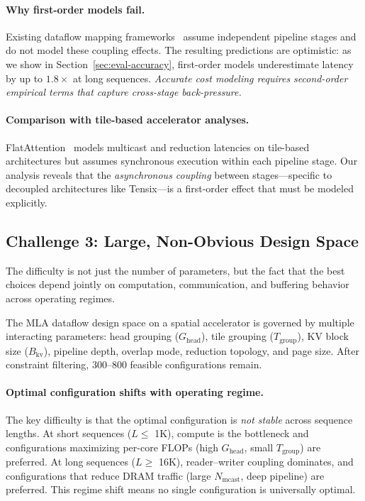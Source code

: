 \documentclass[sigconf, review, anonymous]{acmart}
\newcommand{\Bkv}{B_{\mathrm{kv}}}
\newcommand{\Ghead}{G_{\mathrm{head}}}
\newcommand{\Tgroup}{T_{\mathrm{group}}}
\begin{document}
\paragraph{Why first-order models fail.}
Existing dataflow mapping frameworks~\cite{parashar2019timeloop,
kwon2019maestro} assume independent pipeline stages
and do not model these coupling effects.  The resulting predictions
are optimistic: as we show in Section~\ref{sec:eval-accuracy},
first-order models underestimate latency by up to $1.8\times$ at
long sequences.  \emph{Accurate cost modeling requires second-order
empirical terms that capture cross-stage back-pressure.}

\paragraph{Comparison with tile-based accelerator analyses.}
FlatAttention~\cite{flatattention2024} models multicast and
reduction latencies on tile-based architectures but assumes
synchronous execution within each pipeline stage.  Our analysis
reveals that the \emph{asynchronous coupling} between stages---specific
to decoupled architectures like Tensix---is a first-order effect that
must be modeled explicitly.



\subsection{Challenge 3: Large, Non-Obvious Design Space}\label{sec:challenge-space}


The difficulty is not just the number of parameters, but the fact that
the best choices depend jointly on computation, communication, and
buffering behavior across operating regimes.

The MLA dataflow design space on a spatial accelerator is governed by
multiple interacting parameters: head grouping ($\Ghead$), tile
grouping ($\Tgroup$), KV block size ($\Bkv$), pipeline depth,
overlap mode, reduction topology, and page size.  After constraint
filtering, 300--800 feasible configurations remain.

\paragraph{Optimal configuration shifts with operating regime.}
The key difficulty is that the optimal configuration is \emph{not
stable} across sequence lengths.  At short sequences ($L \leq$ 1K),
compute is the bottleneck and configurations maximizing per-core FLOPs
(high $\Ghead$, small $\Tgroup$) are preferred.  At long sequences
($L \geq$ 16K), reader--writer coupling dominates, and configurations
that reduce DRAM traffic (large $N_{\text{mcast}}$, deep pipeline) are
preferred.  This regime shift means no single configuration is
universally optimal.
\end{document}
